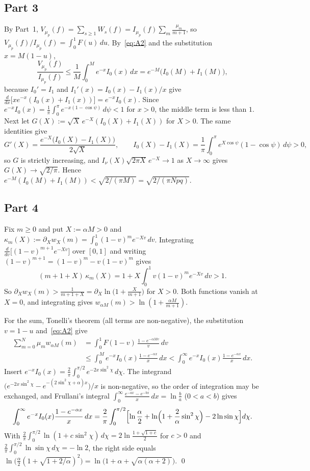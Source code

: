 \documentclass[11pt]{amsart}
\theoremstyle{remark}
\begin{document}
\subsection{Part 3}
By Part~1, $V_{\mu_p}(f) = \sum_{s \ge 1} W_s(f) = I_{\mu_p}(f)\sum_m \frac{\mu_m}{m+1}$, so $V_{\mu_p}(f)/I_{\mu_p}(f) = \int_0^1 F(u)\, du$. By~\eqref{eq:A2} and the substitution $x = M(1-u)$,
\[
\frac{V_{\mu_p}(f)}{I_{\mu_p}(f)} \le \frac{1}{M}\int_0^M e^{-x} I_0(x)\, dx = e^{-M}\bigl(I_0(M) + I_1(M)\bigr),
\]
because $I_0' = I_1$ and $I_1'(x) = I_0(x) - I_1(x)/x$ give $\frac{d}{dx}\bigl[x e^{-x}(I_0(x) + I_1(x))\bigr] = e^{-x} I_0(x)$. Since $e^{-x}I_0(x) = \frac1\pi\int_0^\pi e^{-x(1 - \cos\psi)}\, d\psi < 1$ for $x > 0$, the middle term is less than $1$. Next let $G(X) := \sqrt{X}\, e^{-X}(I_0(X) + I_1(X))$ for $X > 0$. The same identities give
\[
G'(X) = \frac{e^{-X}\bigl(I_0(X) - I_1(X)\bigr)}{2\sqrt{X}}, \qquad I_0(X) - I_1(X) = \frac1\pi\int_0^\pi e^{X\cos\psi}(1 - \cos\psi)\, d\psi > 0,
\]
so $G$ is strictly increasing, and $I_\nu(X)\sqrt{2\pi X}\,e^{-X} \to 1$ as $X \to \infty$ gives $G(X) \to \sqrt{2/\pi}$. Hence $e^{-M}(I_0(M) + I_1(M)) < \sqrt{2/(\pi M)} = \sqrt{2/(\pi N pq)}$.

\subsection{Part 4}
Fix $m \ge 0$ and put $X := \alpha M > 0$ and $\kappa_m(X) := \partial_X w_X(m) = \int_0^1 (1-v)^m e^{-Xv}\, dv$. Integrating $\frac{d}{dv}\bigl[(1-v)^{m+1} e^{-Xv}\bigr]$ over $[0,1]$ and writing $(1-v)^{m+1} = (1-v)^m - v(1-v)^m$ gives
\[
(m + 1 + X)\, \kappa_m(X) = 1 + X\int_0^1 v(1-v)^m e^{-Xv}\, dv > 1 .
\]
So $\partial_X w_X(m) > \frac{1}{m+1+X} = \partial_X \ln\bigl(1 + \frac{X}{m+1}\bigr)$ for $X > 0$. Both functions vanish at $X = 0$, and integrating gives $w_{\alpha M}(m) > \ln(1 + \frac{\alpha M}{m+1})$.

For the sum, Tonelli's theorem (all terms are non-negative), the substitution $v = 1 - u$ and~\eqref{eq:A2} give
\begin{align*}
\sum_{m=0}^N \mu_m w_{\alpha M}(m) &= \int_0^1 F(1 - v)\, \frac{1 - e^{-\alpha M v}}{v}\, dv\\
&\le \int_0^M e^{-x} I_0(x)\frac{1 - e^{-\alpha x}}{x}\, dx < \int_0^\infty e^{-x} I_0(x)\frac{1 - e^{-\alpha x}}{x}\, dx .
\end{align*}
Insert $e^{-x}I_0(x) = \frac2\pi\int_0^{\pi/2} e^{-2x\sin^2\chi}\, d\chi$. The integrand $\bigl(e^{-2x\sin^2\chi} - e^{-(2\sin^2\chi + \alpha)x}\bigr)/x$ is non-negative, so the order of integration may be exchanged, and Frullani's integral $\int_0^\infty \frac{e^{-ax} - e^{-bx}}{x}\, dx = \ln\frac{b}{a}$ ($0 < a < b$) gives
\[
\int_0^\infty e^{-x} I_0(x)\frac{1 - e^{-\alpha x}}{x}\, dx = \frac{2}{\pi}\int_0^{\pi/2} \Bigl[\ln\frac{\alpha}{2} + \ln\Bigl(1 + \frac{2}{\alpha}\sin^2\chi\Bigr) - 2\ln\sin\chi\Bigr] d\chi .
\]
With $\frac2\pi\int_0^{\pi/2}\ln(1 + c\sin^2\chi)\, d\chi = 2\ln\frac{1 + \sqrt{1+c}}{2}$ for $c > 0$ and $\frac2\pi\int_0^{\pi/2}\ln\sin\chi\, d\chi = -\ln 2$, the right side equals $\ln\bigl(\frac{\alpha}{2}(1 + \sqrt{1 + 2/\alpha})^2\bigr) = \ln\bigl(1 + \alpha + \sqrt{\alpha(\alpha+2)}\bigr)$. \qed
\end{document}
